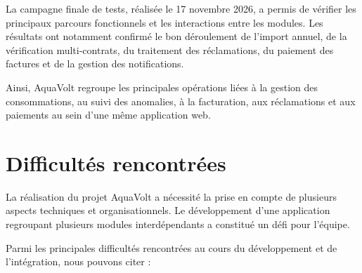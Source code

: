 La campagne finale de tests, réalisée le 17 novembre 2026, a permis de vérifier les principaux parcours fonctionnels et les interactions entre les modules. Les résultats ont notamment confirmé le bon déroulement de l'import annuel, de la vérification multi-contrats, du traitement des réclamations, du paiement des factures et de la gestion des notifications.

Ainsi, AquaVolt regroupe les principales opérations liées à la gestion des consommations, au suivi des anomalies, à la facturation, aux réclamations et aux paiements au sein d'une même application web.

\section{Difficultés rencontrées}

La réalisation du projet AquaVolt a nécessité la prise en compte de plusieurs aspects techniques et organisationnels. Le développement d'une application regroupant plusieurs modules interdépendants a constitué un défi pour l'équipe.

Parmi les principales difficultés rencontrées au cours du développement et de l'intégration, nous pouvons citer :

